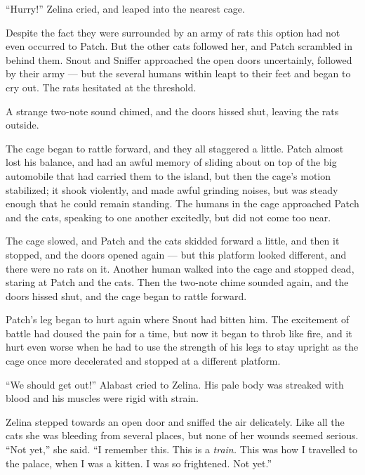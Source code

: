 \documentclass[ebook,oneside,openany,17pt]{memoir}
\newenvironment{tolerant}[1]{%
  \par\tolerance=#1\relax
}{%
  \par
}
\begin{document}
“Hurry!” Zelina cried, and leaped into the nearest cage.

\begin{tolerant}{1000}
Despite the fact they were surrounded by an army of rats this option
had not even occurred to Patch. But the other cats followed her, and
Patch scrambled in behind them. Snout and Sniffer approached the open
doors uncertainly, followed by their army — but the several humans
within leapt to their feet and began to cry out. The rats hesitated at
the threshold.
\end{tolerant}

A strange two-note sound chimed, and the doors hissed shut, leaving
the rats outside.

The cage began to rattle forward, and they all staggered a
little. Patch almost lost his balance, and had an awful memory of
sliding about on top of the big automobile that had carried them to
the island, but then the cage’s motion stabilized; it shook violently,
and made awful grinding noises, but was steady enough that he could
remain standing. The humans in the cage approached Patch and the cats,
speaking to one another excitedly, but did not come too near.

The cage slowed, and Patch and the cats skidded forward a little, and
then it stopped, and the doors opened again — but this platform looked
different, and there were no rats on it. Another human walked into the
cage and stopped dead, staring at Patch and the cats. Then the
two-note chime sounded again, and the doors hissed shut, and the cage
began to rattle forward.

\begin{tolerant}{1000}
Patch’s leg began to hurt again where Snout had bitten him. The
excitement of battle had doused the pain for a time, but now it began
to throb like fire, and it hurt even worse when he had to use the
strength of his legs to stay upright as the cage once more decelerated
and stopped at a different platform.
\end{tolerant}

“We should get out!” Alabast cried to Zelina. His pale body was
streaked with blood and his muscles were rigid with strain.

Zelina stepped towards an open door and sniffed the air
delicately. Like all the cats she was bleeding from several places,
but none of her wounds seemed serious. “Not yet,” she said. “I
remember this. This is a \emph{train.} This was how I travelled to
the palace, when I was a kitten. I was so frightened. Not yet.”
\end{document}
